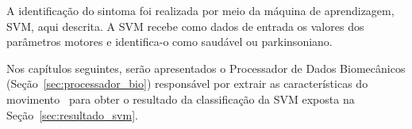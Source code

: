 A identificação do sintoma foi realizada por meio da máquina de aprendizagem, SVM, aqui descrita. A SVM recebe como dados de entrada os valores dos parâmetros motores e identifica-o como saudável ou parkinsoniano.

Nos capítulos seguintes, serão apresentados o Processador de Dados Biomecânicos (Seção~\ref{sec:processador_bio}) responsável por extrair as características do movimento~\cite{mcginnis2013biomechanics} para obter o resultado da classificação da SVM exposta na Seção~\ref{sec:resultado_svm}.

%
%

